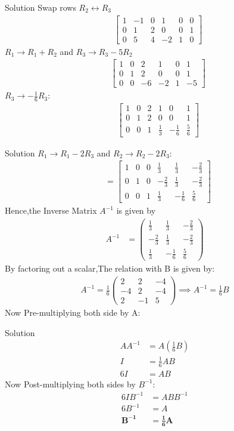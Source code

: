 \documentclass{beamer}
\newcommand{\myvec}[1]{\ensuremath{\begin{pmatrix}#1\end{pmatrix}}}
\providecommand{\brak}[1]{\ensuremath{\left(#1\right)}}
\begin{document}
\begin{frame}{Solution}
	Swap rows $R_2 \leftrightarrow R_3$
\begin{align}
	&\left[ \begin{array}{ccc|ccc} 1 & -1 & 0 & 1 & 0 & 0 \\ 0 & 1 & 2 & 0 & 0 & 1 \\ 0 & 5 & 4 & -2 & 1 & 0 \end{array} \right]
\end{align}
$R_1 \to R_1 + R_2$ and $R_3 \to R_3 - 5R_2$
\begin{align}
	&\left[ \begin{array}{ccc|ccc} 1 & 0 & 2 & 1 & 0 & 1 \\ 0 & 1 & 2 & 0 & 0 & 1 \\ 0 & 0 & -6 & -2 & 1 & -5 \end{array} \right]
\end{align}
$R_3 \to -\frac{1}{6}R_3$:
\begin{align}
	&\left[ \begin{array}{ccc|ccc} 1 & 0 & 2 & 1 & 0 & 1 \\ 0 & 1 & 2 & 0 & 0 & 1 \\ 0 & 0 & 1 & \frac{1}{3} & -\frac{1}{6} & \frac{5}{6} \end{array} \right]
\end{align}
\end{frame}
\begin{frame}{Solution}
$R_1 \to R_1 - 2R_3$ and $R_2 \to R_2 - 2R_3$:
\begin{align}
	[I | A^{-1}] &= \left[ \begin{array}{ccc|ccc} 1 & 0 & 0 & \frac{1}{3} & \frac{1}{3} & -\frac{2}{3} \\ 0 & 1 & 0 & -\frac{2}{3} & \frac{1}{3} & -\frac{2}{3} \\ 0 & 0 & 1 & \frac{1}{3} & -\frac{1}{6} & \frac{5}{6} \end{array} \right]
\end{align}
Hence,the Inverse Matrix {$A^{-1}$} is given by 
\begin{align}
	A^{-1} &= \myvec{ \frac{1}{3} & \frac{1}{3} & -\frac{2}{3} \\[1ex] -\frac{2}{3} & \frac{1}{3} & -\frac{2}{3} \\[1ex] \frac{1}{3} & -\frac{1}{6} & \frac{5}{6} }
\end{align}
By factoring out a scalar,The relation with B is given by:
\begin{align}
	A^{-1} = \frac{1}{6} \myvec{ 2 & 2 & -4 \\ -4 & 2 & -4 \\ 2 & -1 & 5}
	\implies A^{-1} = \frac{1}{6}B 
\end{align}
Now Pre-multiplying both side by A:


\end{frame}
\begin{frame}{Solution}
\begin{align}
	A A^{-1} &= A \brak{\frac{1}{6}B} \\
	I &= \frac{1}{6}AB \\
	6I &= AB 
\end{align}
Now Post-multiplying both sides by $B^{-1}$:
\begin{align}
	6I B^{-1} &= A B B^{-1} \\
	6B^{-1} &= A \\
	\mathbf{B^{-1}} &= \mathbf{\frac{1}{6}A}
\end{align}
\end{frame}
\end{document}
